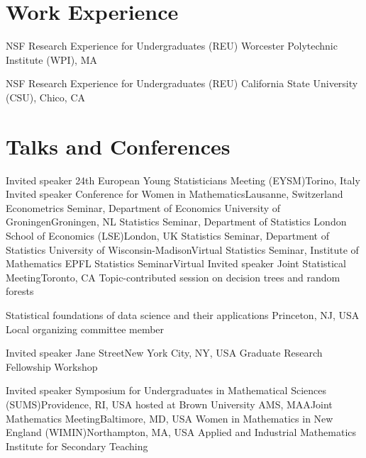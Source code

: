 \documentclass[10pt,a4paper,roman]{moderncv}        %
\begin{document}
\vspace{-0.3cm}
\section{Work Experience}
{NSF Research Experience for Undergraduates (REU) }
{Worcester Polytechnic Institute (WPI), MA}
{} {
}

{NSF Research Experience for Undergraduates (REU)}
{California State University (CSU), Chico, CA}
{}
{}

\vspace{-0.3cm}
\section{Talks and Conferences}
{Invited speaker}
{24th European Young Statisticians Meeting (EYSM)}{Torino, Italy}
{}
{}
{Invited speaker}
{Conference for Women in Mathematics}{Lausanne, Switzerland}
{}
{}
{Econometrics Seminar, Department of Economics}
{University of Groningen}{Groningen, NL}
{}
{}
{Statistics Seminar, Department of Statistics}
{London School of Economics (LSE)}{London, UK}
{}
{}
{Statistics Seminar, Department of Statistics}
{University of Wisconsin-Madison}{Virtual}
{}
{}
{Statistics Seminar, Institute of Mathematics}
{EPFL Statistics Seminar}{Virtual}
{}
{}
{Invited speaker}
{Joint Statistical Meeting}{Toronto, CA}
{Topic-contributed session on decision trees and random forests}
{}

{Statistical foundations of data science and their applications}
{Princeton, NJ, USA}
{}{Local organizing committee member}

{Invited speaker}
{Jane Street}{New York City, NY, USA}
{Graduate Research Fellowship Workshop}
{}

{Invited speaker}
{Symposium for Undergraduates in Mathematical Sciences (SUMS)}{Providence, RI, USA}
{hosted at Brown University}
{}
{AMS, MAA}{Joint Mathematics Meeting}{Baltimore, MD, USA}
{}{}
{Women in Mathematics in New England (WIMIN)}{Northampton, MA, USA}
{}{}
{Applied and Industrial Mathematics Institute for Secondary Teaching}
{}
\end{document}

